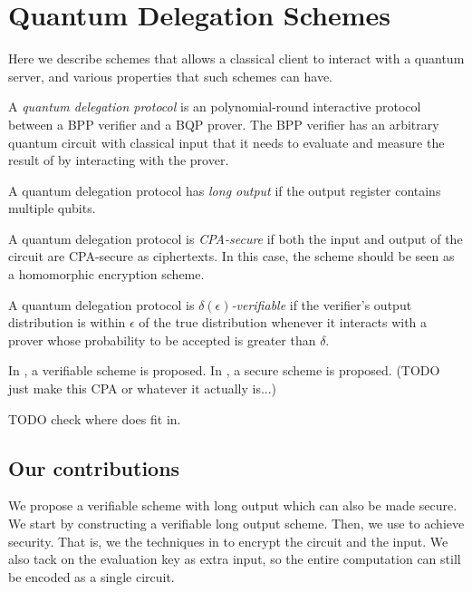 \section{Quantum Delegation Schemes}

Here we describe schemes that allows a classical client to interact with a quantum server, and various properties that such schemes can have.

\begin{definition}
	A \emph{quantum delegation protocol} is an polynomial-round interactive protocol between a BPP verifier and a BQP prover. The BPP verifier has an arbitrary quantum circuit with classical input that it needs to evaluate and measure the result of by interacting with the prover.
\end{definition}

\begin{definition}
	A quantum delegation protocol has \emph{long output} if the output register contains multiple qubits.
\end{definition}

\begin{definition}
	A quantum delegation protocol is \emph{CPA-secure} if both the input and output of the circuit are CPA-secure as ciphertexts. In this case, the scheme should be seen as a homomorphic encryption scheme.
\end{definition}

\begin{definition}
	A quantum delegation protocol is \emph{$\delta(\epsilon)$-verifiable} if the verifier's output distribution is within $\epsilon$ of the true distribution whenever it interacts with a prover whose probability to be accepted is greater than $\delta$.
\end{definition}

In \cite{mahadev_delegation}, a verifiable scheme is proposed. In \cite{mahadev_qfhe}, a secure scheme is proposed. (TODO just make this CPA or whatever it actually is...) 

TODO check where does \cite{1904.06320} fit in.

\subsection{Our contributions}

We propose a verifiable scheme with long output which can also be made secure. We start by constructing a verifiable long output scheme. Then, we use \cite{mahadev_delegation} to achieve security. That is, we the techniques in \cite{mahadev_delegation} to encrypt the circuit and the input. We also tack on the evaluation key as extra input, so the entire computation can still be encoded as a single circuit.
